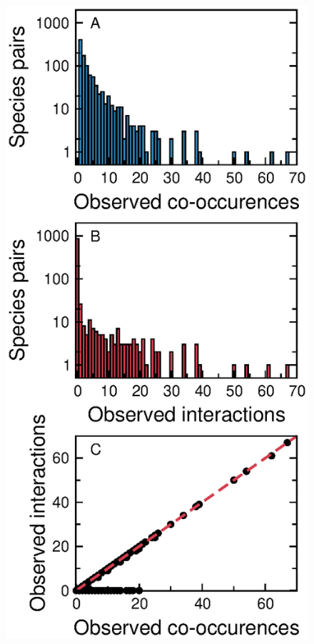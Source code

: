 \documentclass[12pt]{article}
\begin{document}
\begin{figure}[h!]
\begin{center}
          \includegraphics*[height=.65\textheight]{figures/SG_histogram.eps}
          \end{center}
          \end{figure}
\end{document}
